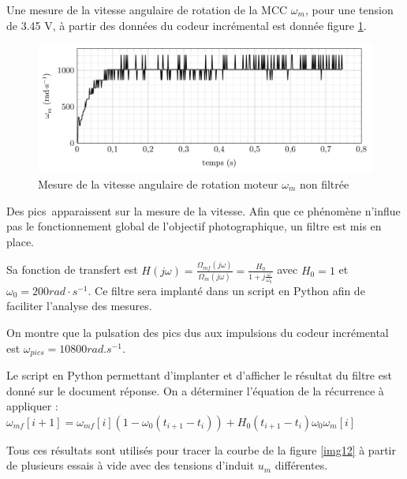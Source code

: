 Une mesure de la vitesse angulaire de rotation de la MCC $\omega_m$, pour une tension de 3.45 V, à partir des données du codeur incrémental est donnée figure \ref{img11}.

\begin{figure}[!h]
\centering\includegraphics[width=0.9\linewidth]{img/figure_11}
 \caption{Mesure de la vitesse angulaire de rotation moteur $\omega_m$ non filtrée}
 \label{img11}
\end{figure}

Des \og pics\fg\ apparaissent sur la mesure de la vitesse. Afin que ce phénomène n'influe pas le fonctionnement global de l'objectif photographique, un filtre est mis en place.

Sa fonction de transfert est $H(j\omega)=\frac{\Omega_{mf}(j\omega)}{\Omega_{m}(j\omega)}=\frac{H_0}{1+j\frac{\omega}{\omega_0}}$
avec $H_0=1$ et $\omega_0=200rad\cdot s^{-1}$. Ce filtre sera implanté dans un script en Python afin de faciliter l'analyse des mesures.

On montre que la pulsation des pics dus aux impulsions du codeur incrémental est $\omega_{pics}=10800rad.s^{-1}$.


Le script en Python permettant d'implanter et d'afficher le résultat du filtre est donné sur le document réponse. On a déterminer l'équation de la récurrence à appliquer : \\
$\omega_{mf}[i+1]=\omega_{mf}[i](1-\omega_0(t_{i+1}-t_i))+H_0(t_{i+1}-t_i)\omega_0\omega_m[i]$


Tous ces résultats sont utilisés pour tracer la courbe de la figure \ref{img12} à partir de plusieurs essais à vide avec des tensions d'induit $u_m$ différentes.

